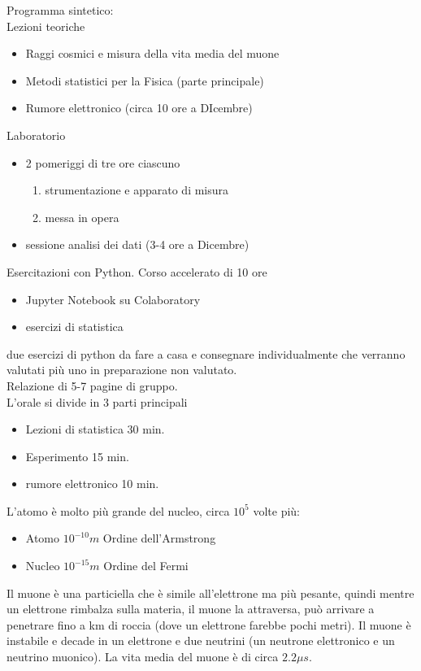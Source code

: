 \documentclass[a4paper, oneside]{article}
\begin{document}
Programma sintetico:\\
Lezioni teoriche
\begin{itemize}
    \item Raggi cosmici e misura della vita media del muone
    \item Metodi statistici per la Fisica (parte principale)
    \item Rumore elettronico (circa 10 ore a DIcembre)
\end{itemize}
Laboratorio
\begin{itemize}
    \item 2 pomeriggi di tre ore ciascuno \begin{enumerate}
        \item strumentazione e apparato di misura
        \item messa in opera
    \end{enumerate}
    \item sessione analisi dei dati (3-4 ore a Dicembre)
\end{itemize}
Esercitazioni con Python. Corso accelerato di 10 ore
\begin{itemize}
    \item Jupyter Notebook su Colaboratory 
    \item esercizi di statistica
\end{itemize}
due esercizi di python da fare a casa e consegnare individualmente che verranno valutati più uno in preparazione non valutato.\\
Relazione di 5-7 pagine di gruppo.\\
L'orale si divide in 3 parti principali
\begin{itemize}
    \item Lezioni di statistica 30 min.
    \item Esperimento 15 min.
    \item rumore elettronico 10 min.
\end{itemize}
L'atomo è molto più grande del nucleo, circa $10^5$ volte più:\\
\begin{itemize}
    \item Atomo $10^{-10} m$ Ordine dell'Armstrong
    \item Nucleo $10^{-15} m$ Ordine del Fermi
\end{itemize}

Il muone è una particiella che è simile all'elettrone ma più pesante, quindi mentre un elettrone rimbalza sulla materia, il muone la attraversa, può arrivare a penetrare fino a km di roccia (dove un elettrone farebbe pochi metri). Il muone è instabile e decade in un elettrone e due neutrini (un neutrone elettronico e un neutrino muonico). La vita media del muone è di circa $2.2 \mu s$.\\
\end{document}
